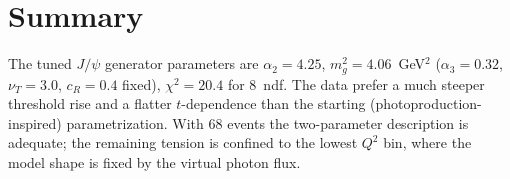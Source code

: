 \documentclass[12pt,a4paper]{article}
\begin{document}
\section{Summary}

The tuned $J/\psi$ generator parameters are $\alpha_2 = 4.25$, $m_g^2 = 4.06$~GeV$^2$ ($\alpha_3 = 0.32$, $\nu_T = 3.0$, $c_R = 0.4$ fixed), $\chi^2 = 20.4$ for 8~ndf. The data prefer a much steeper threshold rise and a flatter
$t$-dependence than the starting (photoproduction-inspired) parametrization.
With 68 events the two-parameter description is adequate; the remaining
tension is confined to the lowest $Q^2$ bin, where the model shape is fixed
by the virtual photon flux.
\end{document}
